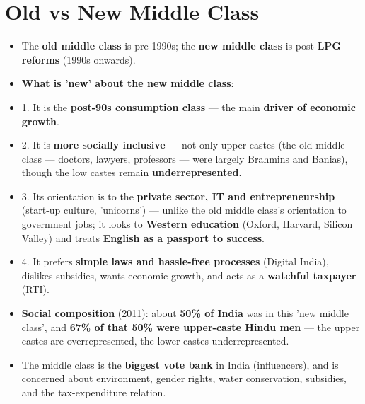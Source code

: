 \section{Old vs New Middle Class}

\begin{KeyConcept}
\begin{itemize}
\item The \textbf{old middle class} is pre-1990s; the \textbf{new middle class} is post-\textbf{LPG reforms} (1990s onwards).
\item \textbf{What is 'new' about the new middle class}:
\item 1. It is the \textbf{post-90s consumption class} --- the main \textbf{driver of economic growth}.
\item 2. It is \textbf{more socially inclusive} --- not only upper castes (the old middle class --- doctors, lawyers, professors --- were largely Brahmins and Banias), though the low castes remain \textbf{underrepresented}.
\item 3. Its orientation is to the \textbf{private sector, IT and entrepreneurship} (start-up culture, 'unicorns') --- unlike the old middle class's orientation to government jobs; it looks to \textbf{Western education} (Oxford, Harvard, Silicon Valley) and treats \textbf{English as a passport to success}.
\item 4. It prefers \textbf{simple laws and hassle-free processes} (Digital India), dislikes subsidies, wants economic growth, and acts as a \textbf{watchful taxpayer} (RTI).
\item \textbf{Social composition} (2011): about \textbf{50\% of India} was in this 'new middle class', and \textbf{67\% of that 50\% were upper-caste Hindu men} --- the upper castes are overrepresented, the lower castes underrepresented.
\item The middle class is the \textbf{biggest vote bank} in India (influencers), and is concerned about environment, gender rights, water conservation, subsidies, and the tax-expenditure relation.
\end{itemize}
\end{KeyConcept}

